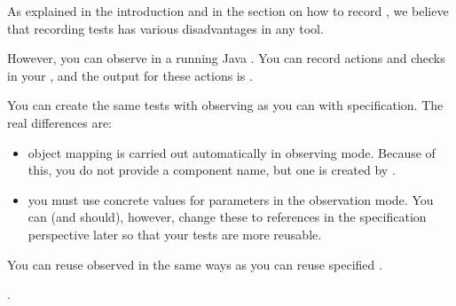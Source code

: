 
As explained in the introduction  and in the section on how to record , we believe that recording tests has various disadvantages in any tool. 

However, you can  observe \gdcases{} in a running Java \gdaut{}. You can record actions and checks in your \gdaut{}, and the output for these actions is \gdsteps{}. 

You can create the same tests with observing as you can with specification. The real differences are:
\begin{itemize}
\item object mapping is carried out automatically in observing mode. Because of this, you do not provide a component name, but one is created by \app{}. 
\item you must use concrete values for parameters in the observation mode. You can (and should), however, change these to references in the specification perspective later so that your tests are more reusable. 
\end{itemize}

You can reuse observed \gdcases{} in the same ways as you can reuse specified \gdcases{}. 

. 


     



